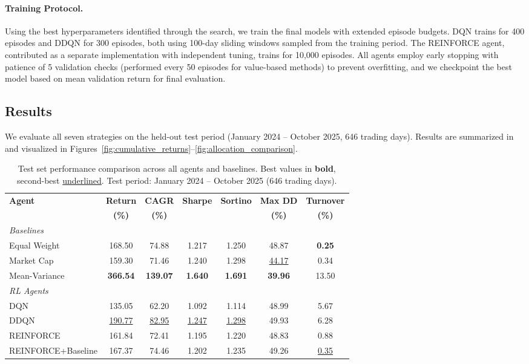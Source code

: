 \paragraph{Training Protocol.} Using the best hyperparameters identified through the search, we train the final models with extended episode budgets. DQN trains for 400 episodes and DDQN for 300 episodes, both using 100-day sliding windows sampled from the training period. The REINFORCE agent, contributed as a separate implementation with independent tuning, trains for 10,000 episodes. All agents employ early stopping with patience of 5 validation checks (performed every 50 episodes for value-based methods) to prevent overfitting, and we checkpoint the best model based on mean validation return for final evaluation.

\subsection{Results}
\label{sec:results}

We evaluate all seven strategies on the held-out test period (January 2024 -- October 2025, 646 trading days). Results are summarized in  and visualized in Figures~\ref{fig:cumulative_returns}--\ref{fig:allocation_comparison}.

\begin{table}[htbp]
\centering
\caption{Test set performance comparison across all agents and baselines. Best values in \textbf{bold}, second-best \underline{underlined}. Test period: January 2024 -- October 2025 (646 trading days).}
\label{tab:main_results}
\small
\begin{tabular}{@{}lcccccc@{}}
\toprule
\textbf{Agent} & \textbf{Return} & \textbf{CAGR} & \textbf{Sharpe} & \textbf{Sortino} & \textbf{Max DD} & \textbf{Turnover} \\
 & \textbf{(\%)} & \textbf{(\%)} & & & \textbf{(\%)} & \textbf{(\%)} \\
\midrule
\multicolumn{7}{l}{\textit{Baselines}} \\
Equal Weight     & 168.50 & 74.88 & 1.217 & 1.250 & 48.87 & \textbf{0.25} \\
Market Cap       & 159.30 & 71.46 & 1.240 & 1.298 & \underline{44.17} & 0.34 \\
Mean-Variance    & \textbf{366.54} & \textbf{139.07} & \textbf{1.640} & \textbf{1.691} & \textbf{39.96} & 13.50 \\
\midrule
\multicolumn{7}{l}{\textit{RL Agents}} \\
DQN              & 135.05 & 62.20 & 1.092 & 1.114 & 48.99 & 5.67 \\
DDQN             & \underline{190.77} & \underline{82.95} & \underline{1.247} & \underline{1.298} & 49.93 & 6.28 \\
REINFORCE        & 161.84 & 72.41 & 1.195 & 1.220 & 48.83 & 0.88 \\
REINFORCE+Baseline & 167.37 & 74.46 & 1.202 & 1.235 & 49.26 & \underline{0.35} \\
\bottomrule
\end{tabular}
\end{table}

